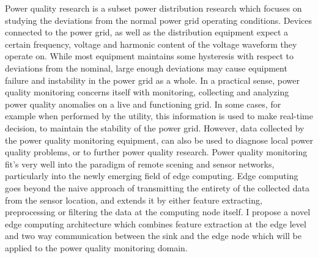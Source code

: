 Power quality research is a subset power distribution research which focuses on studying the deviations from the normal power grid operating conditions. Devices connected to the power grid, as well as the distribution equipment expect a certain frequency, voltage and harmonic content of the voltage waveform they operate on. While most equipment maintains some hysteresis with respect to deviations from the nominal, large enough deviations may cause equipment failure and instability in the power grid as a whole. In a practical sense, power quality monitoring concerns itself with monitoring, collecting and analyzing power quality anomalies on a live and functioning grid. In some cases, for example when performed by the utility, this information is used to make real-time decision, to maintain the stability of the power grid. However, data collected by the power quality monitoring equipment, can also be used to diagnose local power quality problems, or to further power quality research. Power quality monitoring fit's very well into the paradigm of remote scening and sensor networks, particularly into the newly emerging field of edge computing. Edge computing goes beyond the naive approach of transmitting the entirety of the collected data from the sensor location, and extends it by either feature extracting, preprocessing or filtering the data at the computing node itself. I propose a novel edge computing architecture which combines feature extraction at the edge level and two way communication between the sink and the edge node which will be applied to the power quality monitoring domain.

